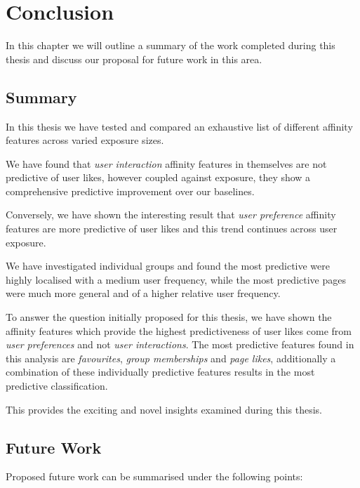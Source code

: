 
\chapter{Conclusion}
\label{cha:conc}

In this chapter we will outline a summary of the work completed during this thesis and discuss our proposal for future work in this area.

\section{Summary}
\label{sec:conc}

In this thesis we have tested and compared an exhaustive list of different affinity features across varied exposure sizes.

We have found that \emph{user interaction} affinity features in themselves are not predictive of user likes, however coupled against 
exposure, they show a comprehensive predictive improvement over our baselines.

Conversely, we have shown the interesting result that \emph{user preference} affinity features are more predictive of user likes
and this trend continues across user exposure.

We have investigated individual groups and found the most predictive were highly localised with a medium
user frequency, while the most predictive pages were much more general and of a higher relative user frequency.

To answer the question initially proposed for this thesis, we have shown the affinity features which provide the highest predictiveness of user likes come from \emph{user preferences} and not
\emph{user interactions}. The most predictive features found in this analysis are \emph{favourites}, \emph{group memberships} 
and \emph{page likes}, additionally a combination of these individually predictive features results in the most predictive classification.

This provides the exciting and novel insights examined during this thesis.

\section{Future Work}
\label{sec:ftw}

Proposed future work can be summarised under the following points:

